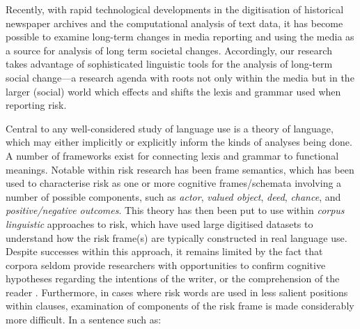 Recently, with rapid technological developments in the digitisation of historical newspaper archives and the computational analysis of text data, it has become possible to examine long-term changes in media reporting and using the media as a source for analysis of long term societal changes. Accordingly, our research takes advantage of sophisticated linguistic tools for the analysis of long-term social change---a research agenda with roots not only within the media but in the larger (social) world which effects and shifts the lexis and grammar used when reporting risk.


Central to any well-considered study of language use is a theory of language, which may either implicitly or explicitly inform the kinds of analyses being done. A number of frameworks exist for connecting lexis and grammar to functional meanings. Notable within risk research has been frame semantics, which has been used to characterise risk as one or more cognitive frames\slash schemata involving a number of possible components, such as \emph{actor}, \emph{valued object}, \emph{deed}, \emph{chance}, and \emph{positive\slash negative outcomes}. This theory has then been put to use within \emph{corpus linguistic} approaches to risk, which have used large digitised datasets to understand how the risk frame(s) are typically constructed in real language use. Despite successes within this approach, it remains limited by the fact that corpora seldom provide researchers with opportunities to confirm cognitive hypotheses regarding the intentions of the writer, or the comprehension of the reader \cite{fillmore_toward_1992}. Furthermore, in cases where risk words are used in less salient positions within clauses, examination of components of the risk frame is made considerably more difficult. In a sentence such as:

